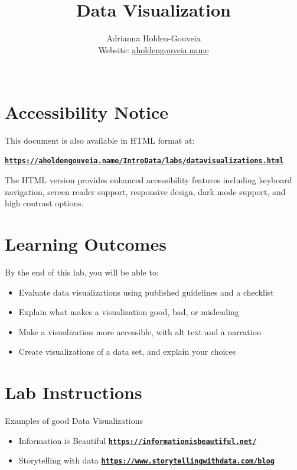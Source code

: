 \documentclass[12pt]{article}
\title{Data Visualization}
\author{
        Adrianna Holden-Gouveia \\
        Website: \href{https://aholdengouveia.name}{aholdengouveia.name}\\
        \faGithub {: aholdengouveia} \\
        }
\date{\vspace{-5ex}}
\begin{document}
    

\maketitle



\section*{Accessibility Notice}
This document is also available in HTML format at:

\href{https://aholdengouveia.name/IntroData/labs/datavisualizations.html}
{\textbf{\nolinkurl{https://aholdengouveia.name/IntroData/labs/datavisualizations.html}}}

The HTML version provides enhanced accessibility features including keyboard navigation, screen reader support, responsive design, dark mode support, and high contrast options.

\section*{Learning Outcomes}
By the end of this lab, you will be able to:
\begin{itemize}
    \item Evaluate data visualizations using published guidelines and a checklist
    \item Explain what makes a visualization good, bad, or misleading
    \item Make a visualization more accessible, with alt text and a narration
    \item Create visualizations of a data set, and explain your choices
\end{itemize}

\section*{Lab Instructions}


Examples of good Data Visualizations
\begin{itemize}
    \item Information is Beautiful \href{https://informationisbeautiful.net/}{\textbf{\nolinkurl{https://informationisbeautiful.net/}}}
    \item Storytelling with data \href{https://www.storytellingwithdata.com/blog}{\textbf{\nolinkurl{https://www.storytellingwithdata.com/blog}}}
\end{itemize}    
\end{document}
